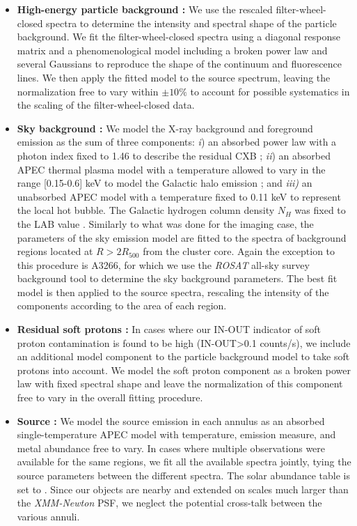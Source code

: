 \documentclass[traditabstract   ]{aa} %
\begin{document}
\begin{itemize}
\item \textbf{High-energy particle background :} We use the rescaled filter-wheel-closed spectra to determine the intensity and spectral shape of the particle background. We fit the filter-wheel-closed spectra using a diagonal response matrix and a phenomenological model including a broken power law and several Gaussians to reproduce the shape of the continuum and fluorescence lines. We then apply the fitted model to the source spectrum, leaving the normalization free to vary within $\pm10\%$ to account for possible systematics in the scaling of the filter-wheel-closed data.
\item \textbf{Sky background :} We model the X-ray background and foreground emission as the sum of three components: \emph{i}) an absorbed power law with a photon index fixed to 1.46 to describe the residual CXB \citep{deluca04}; \emph{ii}) an absorbed APEC thermal plasma model with a temperature allowed to vary in the range [0.15-0.6] keV to model the Galactic halo emission \citep{mccammon02}; and \emph{iii)} an unabsorbed APEC model with a temperature fixed to 0.11 keV to represent the local hot bubble. The Galactic hydrogen column density $N_H$ was fixed to the LAB value \citep{kalberla05}. Similarly to what was done for the imaging case, the parameters of the sky emission model are fitted to the spectra of background regions located at $R>2R_{500}$ from the cluster core. Again the exception to this procedure is A3266, for which we use the \emph{ROSAT} all-sky survey background tool to determine the sky background parameters. The best fit model is then applied to the source spectra, rescaling the intensity of the components according to the area of each region.
\item \textbf{Residual soft protons :} In cases where our IN-OUT indicator of soft proton contamination is found to be high (IN-OUT>0.1 counts/s), we include an additional model component to the particle background model to take soft protons into account. We model the soft proton component as a broken power law with fixed spectral shape \citep[slopes 0.4 and 0.8 and break energy 5 keV, ][]{lm08} and leave the normalization of this component free to vary in the overall fitting procedure.
\item \textbf{Source :} We model the source emission in each annulus as an absorbed single-temperature APEC model with temperature, emission measure, and metal abundance free to vary. In cases where multiple observations were available for the same regions, we fit all the available spectra jointly, tying the source parameters between the different spectra. The solar abundance table is set to \citet{ag89}. Since our objects are nearby and extended on scales much larger than the \emph{XMM-Newton} PSF, we neglect the potential cross-talk between the various annuli.
\end{itemize} 
\end{document}
